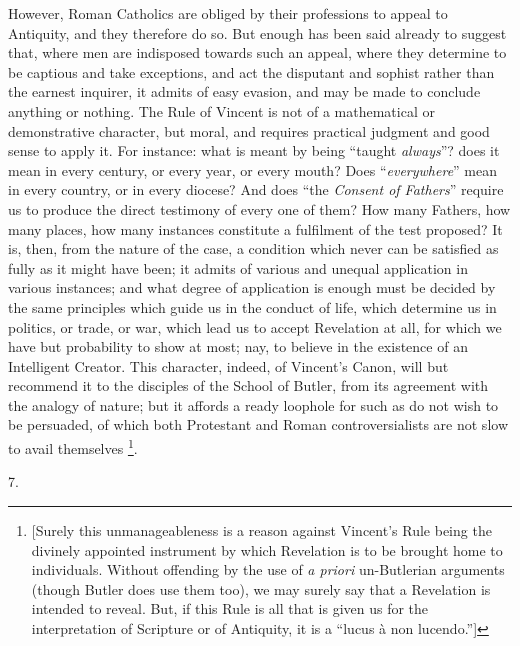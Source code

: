 However, Roman Catholics are obliged by their professions to appeal
to Antiquity, and they therefore do so. But enough has been said
already to suggest that, where men are indisposed towards such an
appeal, where they determine to be captious and take exceptions, and
act the disputant and sophist rather than the earnest inquirer, it
admits of easy evasion, and may be made to conclude anything or
nothing. The Rule of Vincent is not of a mathematical or demonstrative
character, but moral, and requires practical judgment and good sense
to apply it. For instance: what is meant by being ``taught \emph{always}''?
does it mean in every century, or every year, or every mouth? Does
``\emph{everywhere}'' mean in every country, or in every
diocese? And does ``the \emph{Consent of Fathers}'' require us
to produce the direct testimony of every one of them? How many
Fathers, how many places, how many instances constitute a fulfilment
of the test proposed? It is, then, from the nature of the case, a
condition which never can be satisfied as fully as it might have been;
it admits of various and unequal application in various instances; and
what degree of application is enough must be decided by the same
principles which guide us in the conduct of life, which determine us
in politics, or trade, or war, which lead us to accept Revelation at
all, for which we have but probability to show at most; nay, to
believe in the existence of an Intelligent Creator. This character,
indeed, of Vincent's Canon, will but recommend it to the disciples of
the School of Butler, from its agreement with the analogy of nature;
but it affords a ready loophole for such as do not wish to be
persuaded, of which both Protestant and Roman controversialists are
not slow to avail themselves \footnote{[Surely this unmanageableness is a reason
against Vincent's Rule being the divinely appointed instrument by
which Revelation is to be brought home to individuals. Without
offending by the use of \emph{a priori} un-Butlerian arguments (though
Butler does use them too), we may surely say that a Revelation is
intended to reveal. But, if this Rule is all that is given us for the
interpretation of Scripture or of Antiquity, it is a ``lucus à
non lucendo.'']}.

7.

